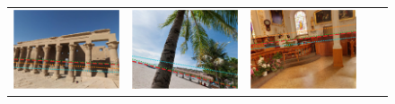 \newcommand{\exampleresultswidth}{0.195}
\begin{figure}
\centering
\bgroup
\setlength{\tabcolsep}{1pt}
\begin{tabular}{cccc|c}
\includegraphics[width=\exampleresultswidth\linewidth]{figures/method/results/pano_addbhhhqoevobx_jpg-1.png} &
\includegraphics[width=\exampleresultswidth\linewidth]{figures/method/results/pano_addtdiecjavkue_jpg-3.png} &
\includegraphics[width=\exampleresultswidth\linewidth]{figures/method/results/pano_adddhslzzqcooj_jpg-4.png} &

\end{tabular}
\end{figure}
